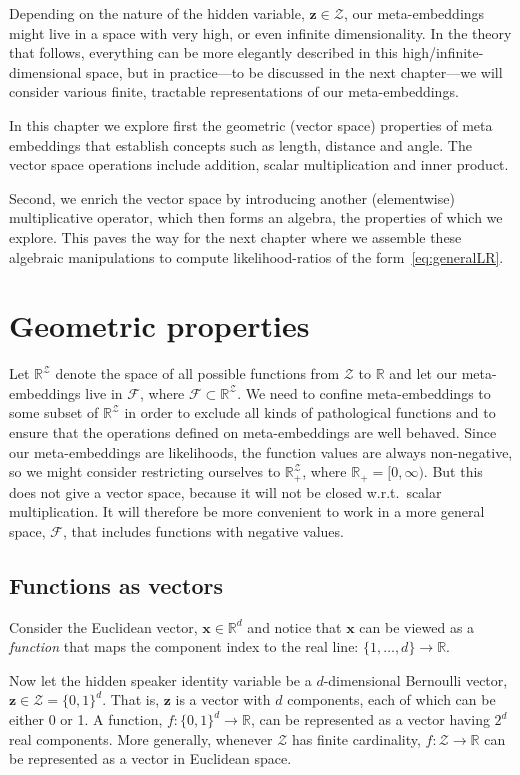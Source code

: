 \documentclass[a4paper,oneside,12pt,english]{report}
\def\zvec{\mathbf{z}}
\def\R{\mathbb{R}}
\def\Zset{\mathcal{Z}}
\def\xvec{\mathbf{x}}
\def\Zset{\mathcal{Z}}
\def\Fset{\mathcal{F}}
\begin{document}
Depending on the nature of the hidden variable, $\zvec\in\Zset$, our meta-embeddings might live in a space with very high, or even infinite dimensionality. In the theory that follows, everything can be more elegantly described in this high/infinite-dimensional space, but in practice---to be discussed in the next chapter---we will consider various finite, tractable representations of our meta-embeddings.

In this chapter we explore first the geometric (vector space) properties of meta embeddings that establish concepts such as length, distance and angle. The vector space operations include addition, scalar multiplication and inner product. 

Second, we enrich the vector space by introducing another (elementwise) multiplicative operator, which then forms an algebra, the properties of which we explore. This paves the way for the next chapter where we assemble these algebraic manipulations to compute likelihood-ratios of the form~\eqref{eq:generalLR}.


\section{Geometric properties}
Let $\R^\Zset$ denote the space of all possible functions from $\Zset$ to $\R$ and let our meta-embeddings live in $\Fset$, where $\Fset\subset\R^{\Zset}$. We need to confine meta-embeddings to some subset of $\R^\Zset$ in order to exclude all kinds of pathological functions and to ensure that the operations defined on meta-embeddings are well behaved. Since our meta-embeddings are likelihoods, the function values are always non-negative, so we might consider restricting ourselves to $\R_+^{\Zset}$, where $\R_+ = [0,\infty)$. But this does not give a vector space, because it will not be closed w.r.t.\ scalar multiplication. It will therefore be more convenient to work in a more general space, $\Fset$, that includes functions with negative values.



\subsection{Functions as vectors}
Consider the Euclidean vector, $\xvec\in\R^d$ and notice that $\xvec$ can be viewed as a \emph{function} that maps the component index to the real line: $\{1,\ldots,d\}\to\R$. 

Now let the hidden speaker identity variable be a $d$-dimensional Bernoulli vector, $\zvec\in\Zset=\{0,1\}^d$. That is, $\zvec$ is a vector with $d$ components, each of which can be either 0 or 1. A function, $f:\{0,1\}^d\to\R$, can be represented as a vector having $2^d$ real components. More generally, whenever $\Zset$ has finite cardinality, $f:\Zset\to\R$ can be represented as a vector in Euclidean space.
\end{document}

